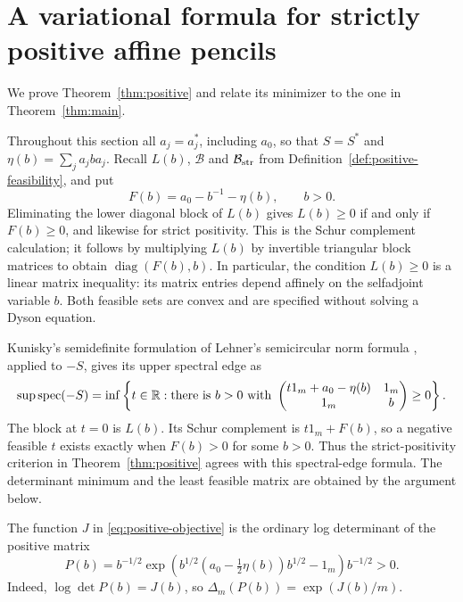 \section{A variational formula for strictly positive affine pencils}\label{sec:positive}


We prove Theorem~\ref{thm:positive} and relate its minimizer to the one in Theorem~\ref{thm:main}.

Throughout this section all $a_j=a_j^*$, including $a_0$, so that $S=S^*$ and $\eta(b)=\sum_j a_jba_j$.
Recall $L(b)$, $\mathcal B$ and $\mathcal B_{\rm str}$ from Definition~\ref{def:positive-feasibility}, and put
\begin{equation}\label{eq:residual}
 F(b)=a_0-b^{-1}-\eta(b),\qquad b>0.
\end{equation}
Eliminating the lower diagonal block of $L(b)$ gives $L(b)\ge0$ if and only if $F(b)\ge0$, and likewise for strict positivity.
This is the Schur complement calculation; it follows by multiplying $L(b)$ by invertible triangular block matrices to obtain $\operatorname{diag}(F(b),b)$.
In particular, the condition $L(b)\ge0$ is a linear matrix inequality: its matrix entries depend affinely on the selfadjoint variable $b$.
Both feasible sets are convex and are specified without solving a Dyson equation.

\begin{remark}
\label{rem:positive-sdp}
Kunisky's semidefinite formulation of Lehner's semicircular norm formula \cite[Theorem 1.9 and Section 4.1]{Kun26}, applied to $-S$, gives its upper spectral edge as
\[
 \sup\operatorname{spec}(-S)=\inf\left\{t\in\mathbb R:
   \text{there is }b>0\text{ with }
   \begin{pmatrix}t1_m+a_0-\eta(b)&1_m\\1_m&b\end{pmatrix}\ge0
                         \right\}.
\]
The block at $t=0$ is $L(b)$.
Its Schur complement is $t1_m+F(b)$, so a negative feasible $t$ exists exactly when $F(b)>0$ for some $b>0$.
Thus the strict-positivity criterion in Theorem~\ref{thm:positive} agrees with this spectral-edge formula.
The determinant minimum and the least feasible matrix are obtained by the argument below.
\end{remark}

The function $J$ in \eqref{eq:positive-objective} is the ordinary log determinant of the positive matrix
\begin{equation}\label{eq:positive-trial-matrix}
 P(b)=b^{-1/2}\exp\left(
 b^{1/2}(a_0-\tfrac12\eta(b))b^{1/2}-1_m\right)b^{-1/2}>0.
\end{equation}
Indeed, $\log\det P(b)=J(b)$, so $\Delta_m(P(b))=\exp(J(b)/m)$.

